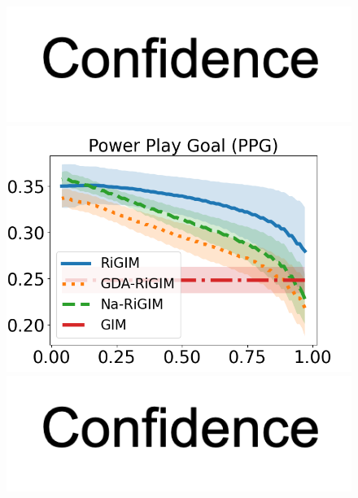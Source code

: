 \documentclass[letterpaper]{article} %
\begin{document}
\begin{figure}[htbp]
\begin{minipage}{0.16\textwidth}
    \vspace{-0.05in}
    \includegraphics[scale=0.12]{figures/confidence_x_label.png}
    \end{minipage}
    \begin{minipage}{0.16\textwidth}
    \centering
    \includegraphics[scale=0.16]{figures/risk_curve_PPG_shadow.png}\par
    \vspace{-0.05in}
    \includegraphics[scale=0.12]{figures/confidence_x_label.png}
    \end{minipage}
    \begin{minipage}{0.01\textwidth}
    \centering

\end{minipage}
\end{figure}
\end{document}
